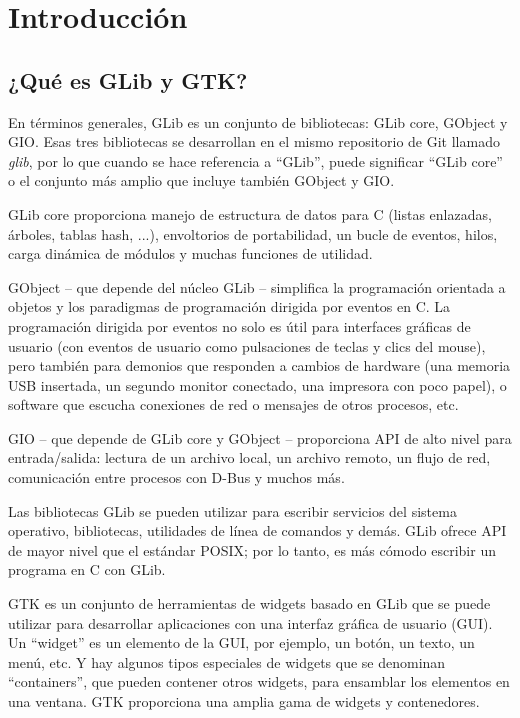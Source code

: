 \chapter{Introducción}

\section{¿Qué es GLib y GTK?}

En términos generales, GLib es un conjunto de bibliotecas: GLib core, GObject y GIO. Esas tres bibliotecas se desarrollan en el mismo repositorio de Git llamado \emph{glib}, por lo que cuando se hace referencia a ``GLib'', puede significar ``GLib core'' o el conjunto más amplio que incluye también GObject y GIO.

GLib core proporciona manejo de estructura de datos para C (listas enlazadas, árboles, tablas hash, ...), envoltorios de portabilidad, un bucle de eventos, hilos, carga dinámica de módulos y muchas funciones de utilidad.

GObject -- que depende del núcleo GLib -- simplifica la programación orientada a objetos y los paradigmas de programación dirigida por eventos en C. La programación dirigida por eventos no solo es útil para interfaces gráficas de usuario (con eventos de usuario como pulsaciones de teclas y clics del mouse), pero también para demonios que responden a cambios de hardware (una memoria USB insertada, un segundo monitor conectado, una impresora con poco papel), o software que escucha conexiones de red o mensajes de otros procesos, etc.

GIO -- que depende de GLib core y GObject -- proporciona API de alto nivel para entrada/salida: lectura de un archivo local, un archivo remoto, un flujo de red, comunicación entre procesos con D-Bus y muchos más.

Las bibliotecas GLib se pueden utilizar para escribir servicios del sistema operativo, bibliotecas, utilidades de línea de comandos y demás. GLib ofrece API de mayor nivel que el estándar POSIX; por lo tanto, es más cómodo escribir un programa en C con GLib.

GTK es un conjunto de herramientas de widgets basado en GLib que se puede utilizar para desarrollar aplicaciones con una interfaz gráfica de usuario (GUI). Un ``widget'' es un elemento de la GUI, por ejemplo, un botón, un texto, un menú, etc. Y hay algunos tipos especiales de widgets que se denominan ``containers'', que pueden contener otros widgets, para ensamblar los elementos en una ventana. GTK proporciona una amplia gama de widgets y contenedores.

